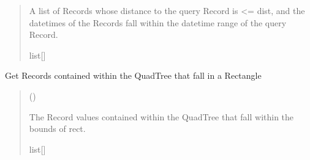\documentclass[letterpaper,10pt,english]{sphinxmanual}
\begin{document}
\begin{fulllineitems}
\begin{fulllineitems}
\begin{quote}
\begin{description}
\begin{itemize}
\end{itemize}

\sphinxAtStartPar
A list of Records whose distance to the
query Record is \textless{}= dist, and the datetimes of the
Records fall within the datetime range of the query
Record.

\sphinxAtStartPar
list{[}{\hyperref[\detokenize{record:GeoSpatialTools.record.Record}]{}}{]}

\end{description}\end{quote}

\end{fulllineitems}


\begin{fulllineitems}
\label{\detokenize{quadtree:GeoSpatialTools.quadtree.QuadTree.query}}
\pysigstartsignatures
\pysiglinewithargsret
{}
{\sphinxparamcomma {}}
{}
\pysigstopsignatures
\sphinxAtStartPar
Get Records contained within the QuadTree that fall in a
Rectangle
\begin{quote}\begin{description}
\sphinxAtStartPar
{} ({\hyperref[\detokenize{shape:GeoSpatialTools.shape.Rectangle}]{}})

\sphinxAtStartPar
The Record values contained within the QuadTree that fall
within the bounds of rect.

\sphinxAtStartPar
list{[}{\hyperref[\detokenize{record:GeoSpatialTools.record.Record}]{}}{]}

\end{description}\end{quote}

\end{fulllineitems}



\end{fulllineitems}
\end{document}
